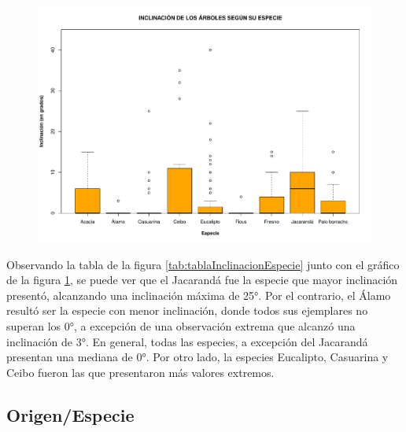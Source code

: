 \documentclass[11pt]{article}
\begin{document}
\begin{figure}[h!]
  \begin{center}
    \includegraphics[width=0.9\linewidth]{boxInclinacionEspecie.pdf}
    \caption{}
    \label{fig:boxInclinacionEspecie}
  \end{center}
\end{figure}

\begin{justify}
  Observando la tabla de la figura \ref{tab:tablaInclinacionEspecie} junto con el
  gráfico de la figura \ref{fig:boxInclinacionEspecie}, se puede ver que el
  Jacarandá fue la especie que mayor inclinación presentó, alcanzando una
  inclinación máxima de 25°. Por el contrario, el Álamo resultó ser la especie
  con menor inclinación, donde todos sus ejemplares no superan los 0°,
  a excepción de una observación extrema que alcanzó una inclinación de 3°.
  En general, todas las especies, a excepción del Jacarandá presentan una mediana
  de 0°. Por otro lado, la especies Eucalipto, Casuarina y Ceibo fueron las que
  presentaron más valores extremos.
\end{justify}


\newpage
\subsection{Origen/Especie}
\end{document}
